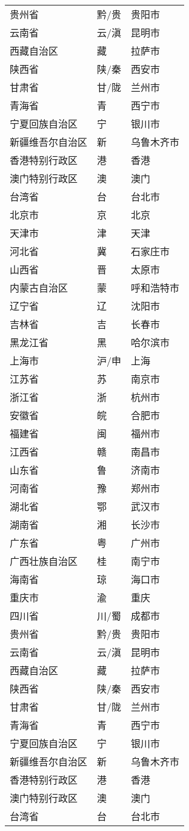 \begin{longtable}{l@{\hspace{6.5mm}}l@{\hspace{5.5mm}}l}
贵州省 & 黔/贵 & 贵阳市\\
云南省 & 云/滇 & 昆明市\\
西藏自治区 & 藏 & 拉萨市\\
陕西省 & 陕/秦 & 西安市\\
甘肃省 & 甘/陇 & 兰州市\\
青海省 & 青 & 西宁市\\
宁夏回族自治区 & 宁 & 银川市\\
新疆维吾尔自治区 & 新 & 乌鲁木齐市\\
香港特别行政区 & 港 & 香港\\
澳门特别行政区 & 澳 & 澳门\\
台湾省 & 台 & 台北市\\
北京市 & 京 & 北京\\
天津市 & 津 & 天津\\
河北省 & 冀 & 石家庄市\\
山西省 & 晋 & 太原市\\
内蒙古自治区 & 蒙 & 呼和浩特市\\
辽宁省 & 辽 & 沈阳市\\
吉林省 & 吉 & 长春市\\
黑龙江省 & 黑 & 哈尔滨市\\
上海市 & 沪/申 & 上海\\
江苏省 & 苏 & 南京市\\
浙江省 & 浙 & 杭州市\\
安徽省 & 皖 & 合肥市\\
福建省 & 闽 & 福州市\\
江西省 & 赣 & 南昌市\\
山东省 & 鲁 & 济南市\\
河南省 & 豫 & 郑州市\\
湖北省 & 鄂 & 武汉市\\
湖南省 & 湘 & 长沙市\\
广东省 & 粤 & 广州市\\
广西壮族自治区 & 桂 & 南宁市\\
海南省 & 琼 & 海口市\\
重庆市 & 渝 & 重庆\\
四川省 & 川/蜀 & 成都市\\
贵州省 & 黔/贵 & 贵阳市\\
云南省 & 云/滇 & 昆明市\\
西藏自治区 & 藏 & 拉萨市\\
陕西省 & 陕/秦 & 西安市\\
甘肃省 & 甘/陇 & 兰州市\\
青海省 & 青 & 西宁市\\
宁夏回族自治区 & 宁 & 银川市\\
新疆维吾尔自治区 & 新 & 乌鲁木齐市\\
香港特别行政区 & 港 & 香港\\
澳门特别行政区 & 澳 & 澳门\\
台湾省 & 台 & 台北市\\
\end{longtable}

